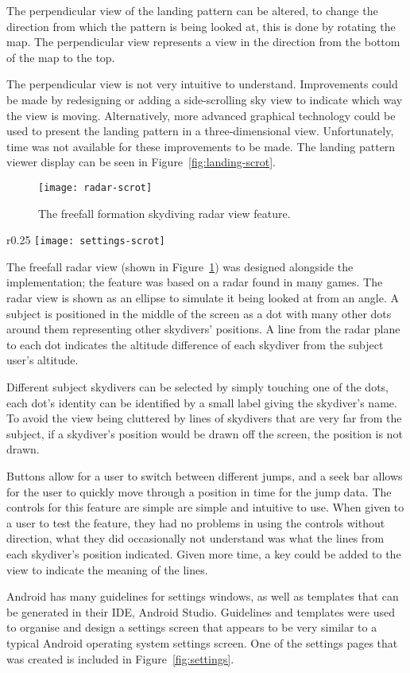 The perpendicular view of the landing pattern can be altered, to change the direction from which the pattern is being looked at, this is done by rotating the map. The perpendicular view represents a view in the direction from the bottom of the map to the top.

The perpendicular view is not very intuitive to understand. Improvements could be made by redesigning or adding a side-scrolling sky view to indicate which way the view is moving. Alternatively, more advanced graphical technology could be used to present the landing pattern in a three-dimensional view. Unfortunately, time was not available for these improvements to be made.
The landing pattern viewer display can be seen in Figure~\ref{fig:landing-scrot}.

\begin{figure}[!t]
  \centering
  \texttt{[image: radar-scrot]}
  \caption{The freefall formation skydiving radar view feature.}\label{fig:radar}
\end{figure}

\begin{wrapfigure}[19]{r}{0.25\textwidth}
  \centering
  \texttt{[image: settings-scrot]}
  \caption{The settings screen for the app.}\label{fig:settings}
\end{wrapfigure}

The freefall radar view (shown in Figure~\ref{fig:radar}) was designed alongside the implementation; the feature was based on a radar found in many games. The radar view is shown as an ellipse to simulate it being looked at from an angle. A subject is positioned in the middle of the screen as a dot with many other dots around them representing other skydivers' positions. A line from the radar plane to each dot indicates the altitude difference of each skydiver from the subject user's altitude.


Different subject skydivers can be selected by simply touching one of the dots, each dot's identity can be identified by a small label giving the skydiver's name. To avoid the view being cluttered by lines of skydivers that are very far from the subject, if a skydiver's position would be drawn off the screen, the position is not drawn.

Buttons allow for a user to switch between different jumps, and a seek bar allows for the user to quickly move through a position in time for the jump data. The controls for this feature are simple are simple and intuitive to use. When given to a user to test the feature, they had no problems in using the controls without direction, what they did occasionally not understand was what the lines from each skydiver's position indicated. Given more time, a key could be added to the view to indicate the meaning of the lines.

Android has many guidelines for settings windows, as well as templates that can be generated in their IDE, Android Studio. Guidelines and templates were used to organise and design a settings screen that appears to be very similar to a typical Android operating system settings screen.
One of the settings pages that was created is included in Figure~\ref{fig:settings}.
